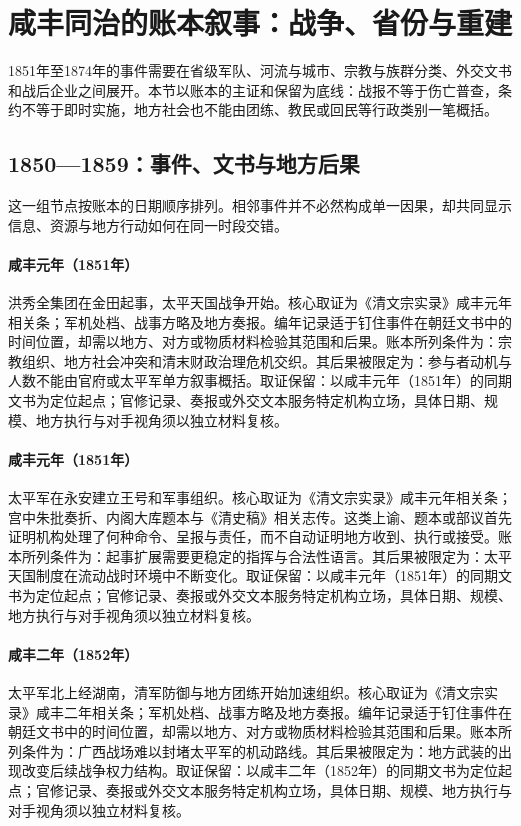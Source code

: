 \section{咸丰同治的账本叙事：战争、省份与重建}
1851年至1874年的事件需要在省级军队、河流与城市、宗教与族群分类、外交文书和战后企业之间展开。本节以账本的主证和保留为底线：战报不等于伤亡普查，条约不等于即时实施，地方社会也不能由团练、教民或回民等行政类别一笔概括。
\subsection{1850—1859：事件、文书与地方后果}
这一组节点按账本的日期顺序排列。相邻事件并不必然构成单一因果，却共同显示信息、资源与地方行动如何在同一时段交错。
\hypertarget{ledger:EQ-1851-JINTIAN-UPRISING}{}\paragraph{咸丰元年（1851年）}洪秀全集团在金田起事，太平天国战争开始。核心取证为《清文宗实录》咸丰元年相关条；军机处档、战事方略及地方奏报。编年记录适于钉住事件在朝廷文书中的时间位置，却需以地方、对方或物质材料检验其范围和后果。账本所列条件为：宗教组织、地方社会冲突和清末财政治理危机交织。其后果被限定为：参与者动机与人数不能由官府或太平军单方叙事概括。取证保留：以咸丰元年（1851年）的同期文书为定位起点；官修记录、奏报或外交文本服务特定机构立场，具体日期、规模、地方执行与对手视角须以独立材料复核。
\hypertarget{ledger:EQ-1851-YONGAN-KINGSHIPS}{}\paragraph{咸丰元年（1851年）}太平军在永安建立王号和军事组织。核心取证为《清文宗实录》咸丰元年相关条；宫中朱批奏折、内阁大库题本与《清史稿》相关志传。这类上谕、题本或部议首先证明机构处理了何种命令、呈报与责任，而不自动证明地方收到、执行或接受。账本所列条件为：起事扩展需要更稳定的指挥与合法性语言。其后果被限定为：太平天国制度在流动战时环境中不断变化。取证保留：以咸丰元年（1851年）的同期文书为定位起点；官修记录、奏报或外交文本服务特定机构立场，具体日期、规模、地方执行与对手视角须以独立材料复核。
\hypertarget{ledger:EQ-1852-TAIPING-NORTHWARD-MARCH}{}\paragraph{咸丰二年（1852年）}太平军北上经湖南，清军防御与地方团练开始加速组织。核心取证为《清文宗实录》咸丰二年相关条；军机处档、战事方略及地方奏报。编年记录适于钉住事件在朝廷文书中的时间位置，却需以地方、对方或物质材料检验其范围和后果。账本所列条件为：广西战场难以封堵太平军的机动路线。其后果被限定为：地方武装的出现改变后续战争权力结构。取证保留：以咸丰二年（1852年）的同期文书为定位起点；官修记录、奏报或外交文本服务特定机构立场，具体日期、规模、地方执行与对手视角须以独立材料复核。
